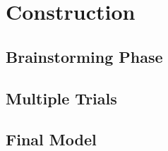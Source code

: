 \section{Construction}

    \subsection{Brainstorming Phase}

    \subsection{Multiple Trials}

    \subsection{Final Model}

